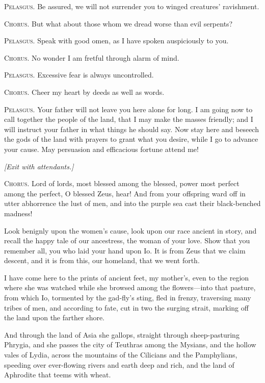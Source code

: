 \documentclass[12pt]{article}
\begin{document}
\textsc{Pelasgus.} Be assured, we will not surrender you to winged creatures' ravishment.

\textsc{Chorus.} But what about those whom we dread worse than evil serpents?

\textsc{Pelasgus.} Speak with good omen, as I have spoken auspiciously to you.

\textsc{Chorus.} No wonder I am fretful through alarm of mind.

\textsc{Pelasgus.} Excessive fear is always uncontrolled.

\textsc{Chorus.} Cheer my heart by deeds as well as words.

\textsc{Pelasgus.} Your father will not leave you here alone for long. I am going now to call together the people of the land, that I may make the masses friendly; and I will instruct your father in what things he should say. Now stay here and beseech the gods of the land with prayers to grant what you desire, while I go to advance your cause. May persuasion and efficacious fortune attend me!

\begin{center}
\textit{[Exit with attendants.]}
\end{center}

\textsc{Chorus.} Lord of lords, most blessed among the blessed, power most perfect among the perfect, O blessed Zeus, hear! And from your offspring ward off in utter abhorrence the lust of men, and into the purple sea cast their black-benched madness!

Look benignly upon the women's cause, look upon our race ancient in story, and recall the happy tale of our ancestress, the woman of your love. Show that you remember all, you who laid your hand upon Io. It is from Zeus that we claim descent, and it is from this, our homeland, that we went forth.

I have come here to the prints of ancient feet, my mother's, even to the region where she was watched while she browsed among the flowers---into that pasture, from which Io, tormented by the gad-fly's sting, fled in frenzy, traversing many tribes of men, and according to fate, cut in two the surging strait, marking off the land upon the farther shore.

And through the land of Asia she gallops, straight through sheep-pasturing Phrygia, and she passes the city of Teuthras among the Mysians, and the hollow vales of Lydia, across the mountains of the Cilicians and the Pamphylians, speeding over ever-flowing rivers and earth deep and rich, and the land of Aphrodite that teems with wheat.
\end{document}
